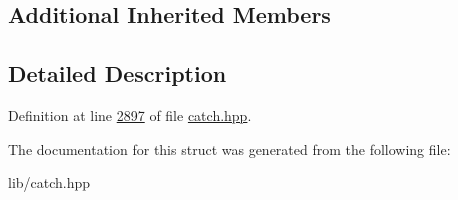\subsection*{Additional Inherited Members}


\subsection{Detailed Description}


Definition at line \mbox{\hyperlink{catch_8hpp_source_l02897}{2897}} of file \mbox{\hyperlink{catch_8hpp_source}{catch.\+hpp}}.



The documentation for this struct was generated from the following file\+:\begin{DoxyCompactItemize}
\item 
lib/catch.\+hpp\end{DoxyCompactItemize}
